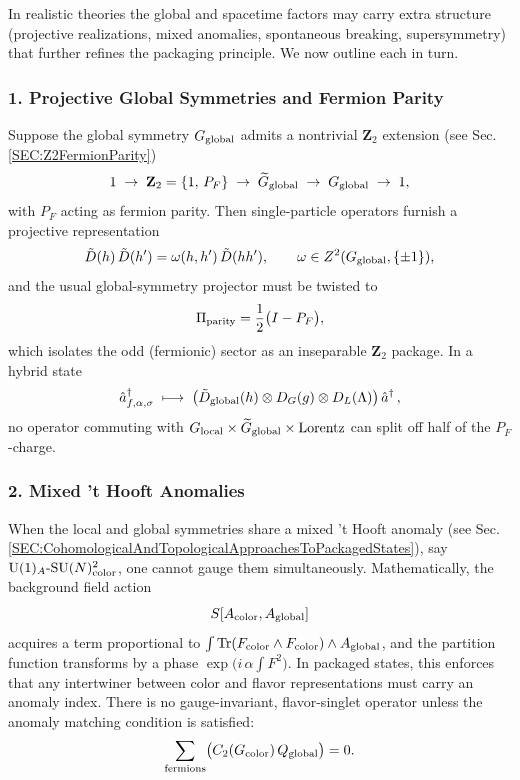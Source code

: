\documentclass[12pt,a4paper]{article}
\begin{document}
In realistic theories the global and spacetime factors may carry extra structure (projective realizations, mixed anomalies, spontaneous breaking, supersymmetry) that further refines the packaging principle.
We now outline each in turn.



\subsubsection*{1. Projective Global Symmetries and Fermion Parity}


Suppose the global symmetry $G_{\rm global}$ admits a nontrivial $\mathbf Z_2$ extension (see Sec. \ref{SEC:Z2FermionParity})
\[
1 \;\to\; \mathbf Z_2 = \{1,\,P_F\}\;\to\;\widetilde G_{\rm global}\;\to\;G_{\rm global}\;\to\;1,
\]
with $P_F$ acting as fermion parity.
Then single-particle operators furnish a projective representation 
\[
\tilde D(h)\,\tilde D(h')=\omega(h,h')\,\tilde D(hh'),
\qquad \omega\in Z^2(G_{\rm global},\{\pm1\}),
\]
and the usual global-symmetry projector must be twisted to
\[
\Pi_{\rm parity}
=\frac12\bigl(I - P_F\bigr),
\]
which isolates the odd (fermionic) sector as an inseparable $\mathbf Z_2$ package.
In a hybrid state
\[
\hat a^\dagger_{f,\alpha,\sigma}
\;\longmapsto\;
\bigl(\tilde D_{\rm global}(h)\otimes D_G(g)\otimes D_L(\Lambda)\bigr)\,
\hat a^\dagger\,,
\]
no operator commuting with $G_{\rm local}\times\widetilde G_{\rm global}\times\mathrm{Lorentz}$ can split off half of the $P_F$-charge.



\subsubsection*{2. Mixed ’t Hooft Anomalies}


When the local and global symmetries share a mixed ’t Hooft anomaly (see Sec. \ref{SEC:CohomologicalAndTopologicalApproachesToPackagedStates}), say $\mathrm{U}(1)_A\text{-}\mathrm{SU}(N)_{\rm color}^2$, one cannot gauge them simultaneously.
Mathematically, the background field action
\[
S[A_{\rm color},A_{\rm global}]
\]
acquires a term proportional to 
$\int \mathrm{Tr}(F_{\rm color}\wedge F_{\rm color})\wedge A_{\rm global}$, 
and the partition function transforms by a phase 
$\exp\bigl(i\,\alpha\int F^2\bigr)$.  
In packaged states, this enforces that any intertwiner between color and flavor representations must carry an anomaly index.
There is no gauge-invariant, flavor-singlet operator unless the anomaly matching condition is satisfied:
\[
\sum_{\rm fermions} \bigl(C_2(G_{\rm color})\,Q_{\rm global}\bigr)=0.
\]
\end{document}
